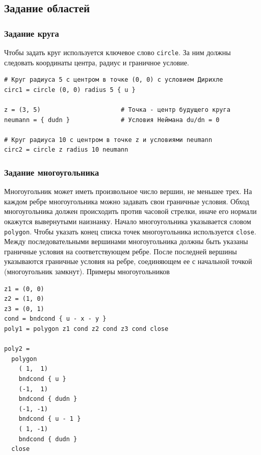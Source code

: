\documentclass[12pt]{article}
\begin{document}
\subsection{Задание областей}
\subsubsection{Задание круга}
Чтобы задать круг используется ключевое слово \verb|circle|. За ним должны следовать координаты центра, радиус и граничное условие.
\begin{verbatim}
# Круг радиуса 5 с центром в точке (0, 0) с условием Дирихле
circ1 = circle (0, 0) radius 5 { u }

z = (3, 5)                      # Точка - центр будущего круга
neumann = { dudn }              # Условия Неймана du/dn = 0

# Круг радиуса 10 с центром в точке z и условиями neumann
circ2 = circle z radius 10 neumann
\end{verbatim}

\subsubsection{Задание многоугольника}
Многоугольник может иметь произвольное число вершин, не меньшее трех. На каждом ребре многоугольника можно задавать свои граничные условия. Обход многоугольника должен происходить против часовой стрелки, иначе его нормали окажутся вывернутыми наизнанку. Начало многоугольника указывается словом \verb|polygon|. Чтобы указать конец списка точек многоугольника используется \verb|close|. Между последовательными вершинами многоугольника должны быть указаны граничные условия на соответствующем ребре. После последней вершины указываются граничные условия на ребре, соединяющем ее с начальной точкой (многоугольник замкнут). Примеры многоугольников
\begin{verbatim}
z1 = (0, 0)
z2 = (1, 0)
z3 = (0, 1)
cond = bndcond { u - x - y }
poly1 = polygon z1 cond z2 cond z3 cond close

poly2 = 
  polygon
    ( 1,  1)
    bndcond { u }
    (-1,  1)
    bndcond { dudn }
    (-1, -1)
    bndcond { u - 1 }
    ( 1, -1)
    bndcond { dudn }
  close
\end{verbatim}
\end{document}
